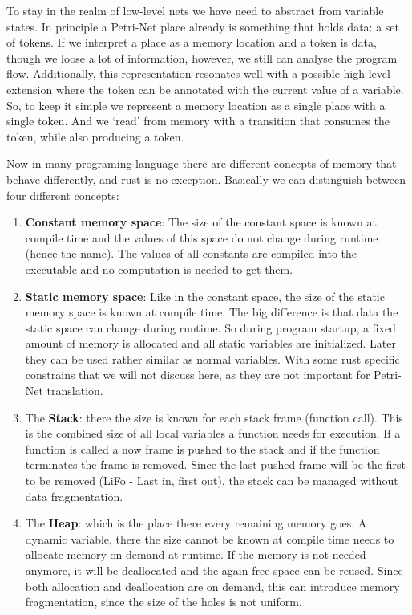 To stay in the realm of low-level nets we have need to abstract from variable states.
In principle a Petri-Net place already is something that holds data: a set of tokens.
If we interpret a place as a memory location and a token is data, though we loose a lot of information, however, we still can analyse the program flow.
Additionally, this representation resonates well with a possible high-level extension where the token can be annotated with the current value of a variable.
So, to keep it simple we represent a memory location as a single place with a single token.
And we `read' from memory with a transition that consumes the token, while also producing a token.

Now in many programing language there are different concepts of memory that behave differently, and rust is no exception.
Basically we can distinguish between four different concepts:
\begin{enumerate}
    \item \textbf{Constant memory space}: The size of the constant space is known at compile time and the values of this space do not change during runtime (hence the name).
    The values of all constants are compiled into the executable and no computation is needed to get them.
    \item \textbf{Static memory space}: Like in the constant space, the size of the static memory space is known at compile time.
    The big difference is that data the static space can change during runtime.
    So during program startup, a fixed amount of memory is allocated and all static variables are initialized.
    Later they can be used rather similar as normal variables. With some rust specific constrains that we will not discuss here, as they are not important for Petri-Net translation.
    \item The \textbf{Stack}: there the size is known for each stack frame (function call).
    This is the combined size of all local variables a function needs for execution.
    If a function is called a now frame is pushed to the stack and if the function terminates the frame is removed.
    Since the last pushed frame will be the first to be removed (LiFo - Last in, first out), the stack can be managed without data fragmentation.
    \item The \textbf{Heap}: which is the place there every remaining memory goes.
    A dynamic variable, there the size cannot be known at compile time needs to allocate memory on demand at runtime.
    If the memory is not needed anymore, it will be deallocated and the again free space can be reused.
    Since both allocation and deallocation are on demand, this can introduce memory fragmentation, since the size of the holes is not uniform.
\end{enumerate}

